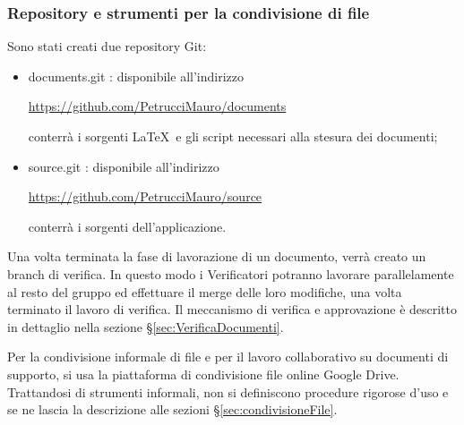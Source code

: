 \subsubsection{Repository e strumenti per la condivisione di file}

Sono stati creati due repository  Git:
\begin{itemize}


\item documents.git  : disponibile all’indirizzo\\
\begin{center}\url{https://github.com/PetrucciMauro/documents}\\\end{center}
conterrà i sorgenti \LaTeX \ e gli script necessari alla stesura dei documenti;
\item source.git : disponibile all’indirizzo\\
\begin{center}
\url{https://github.com/PetrucciMauro/source}\\
\end{center}
conterrà i sorgenti dell’applicazione.\\
\end{itemize}
Una volta terminata la fase di lavorazione di un documento, verrà creato un branch di verifica. In questo modo i Verificatori potranno lavorare parallelamente al resto del gruppo ed effettuare il merge  delle loro modifiche, una volta terminato il lavoro di verifica.
Il meccanismo di verifica e approvazione è descritto in dettaglio nella sezione \S\ref{sec:VerificaDocumenti}.


Per la condivisione informale di file e per il lavoro collaborativo su documenti di supporto, si usa la piattaforma di condivisione file online Google Drive.
Trattandosi di strumenti informali, non si definiscono procedure rigorose d’uso e se ne lascia la descrizione alle sezioni \S\ref{sec:condivisioneFile}.